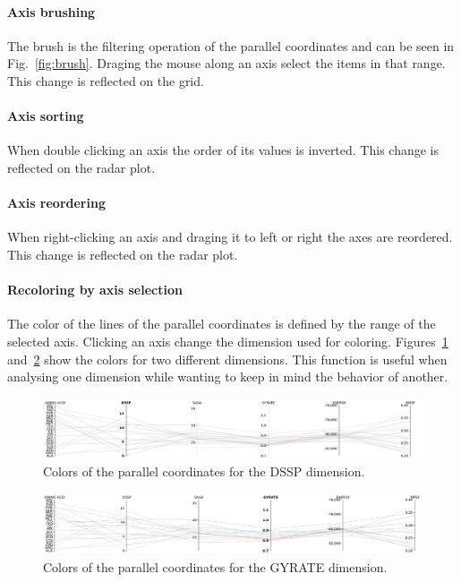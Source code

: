 \documentclass[10pt, conference]{IEEEtran}
\begin{document}
\paragraph*{Axis brushing} The brush is the filtering operation of the parallel coordinates and can be seen in Fig.~\ref{fig:brush}. Draging the mouse along an axis select the items in that range. This change is reflected on the grid.
\paragraph*{Axis sorting} When double clicking an axis the order of its values is inverted. This change is reflected on the radar plot.
\paragraph*{Axis reordering} When right-clicking an axis and draging it to left or right the axes are reordered. This change is reflected on the radar plot.
\paragraph*{Recoloring by axis selection} The color of the lines of the parallel coordinates is defined by the range of the selected axis. Clicking an axis change the dimension used for coloring. Figures~\ref{fig:dssp} and~\ref{fig:gyrate} show the colors for two different dimensions. This function is useful when analysing one dimension while wanting to keep in mind the behavior of another.

\begin{figure}
\includegraphics[width=1.0\linewidth]{figs/dssp.png}
\caption{Colors of the parallel coordinates for the DSSP dimension.} 
\label{fig:dssp}
\end{figure}

\begin{figure}
\includegraphics[width=1.0\linewidth]{figs/gyrate.png}
\caption{Colors of the parallel coordinates for the GYRATE dimension.} 
\label{fig:gyrate}
\end{figure}
\end{document}
